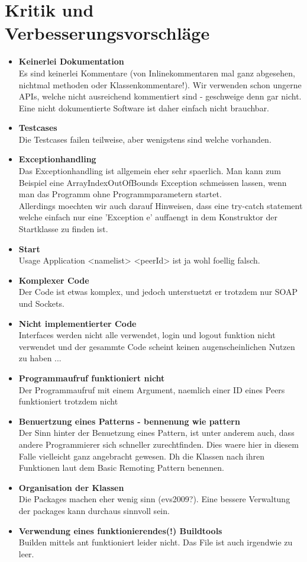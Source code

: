 \documentclass[a4paper]{article}
\begin{document}
\section{Kritik und Verbesserungsvorschläge}
\begin{itemize}
\item \textbf{Keinerlei Dokumentation} \\ 
Es sind keinerlei Kommentare (von Inlinekommentaren mal ganz abgesehen, nichtmal methoden oder Klassenkommentare!). Wir verwenden schon ungerne APIs, welche nicht ausreichend kommentiert sind - geschweige denn gar nicht. Eine nicht dokumentierte Software ist daher einfach nicht brauchbar. 
\item \textbf{Testcases} \\
Die Testcases failen teilweise, aber wenigstens sind welche vorhanden.
\item \textbf{Exceptionhandling} \\
Das Exceptionhandling ist allgemein eher sehr spaerlich. Man kann zum Beispiel eine ArrayIndexOutOfBounds Exception schmeissen lassen, wenn man das Programm ohne Programmparametern startet. \\ 
Allerdings moechten wir auch darauf Hinweisen, dass eine try-catch statement welche einfach nur eine 'Exception e' auffaengt in dem Konstruktor der Startklasse zu finden ist.  
\item \textbf{Start} \\
Usage Application <namelist> <peerId> ist ja wohl foellig falsch.
\item \textbf{Komplexer Code}\\
Der Code ist etwas komplex, und jedoch unterstuetzt er trotzdem nur SOAP und Sockets. 
\item \textbf{Nicht implementierter Code}\\
Interfaces werden nicht alle verwendet, login und logout funktion nicht verwendet und der gesammte Code scheint keinen augenscheinlichen Nutzen zu haben ...
\item \textbf{Programmaufruf funktioniert nicht}\\
Der Programmaufruf mit einem Argument, naemlich einer ID eines Peers funktioniert trotzdem nicht
\item \textbf{Benuertzung eines Patterns - bennenung wie pattern}\\
Der Sinn hinter der Benuetzung eines Pattern, ist unter anderem auch, dass andere Programmierer sich schneller zurechtfinden. Dies waere hier in diesem Falle vielleicht ganz angebracht gewesen. Dh die Klassen nach ihren Funktionen laut dem Basic Remoting Pattern benennen.
\item \textbf{Organisation der Klassen}\\
Die Packages machen eher wenig sinn (evs2009?). Eine bessere Verwaltung der packages kann durchaus sinnvoll sein.
\item \textbf{Verwendung eines funktionierendes(!) Buildtools}\\
Builden mittels ant funktioniert leider nicht. Das File ist auch irgendwie zu leer.

\end{itemize}
\end{document}

